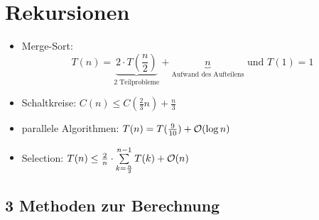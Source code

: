 %
%
\chapter{Rekursionen}
\begin{itemize}
\item
Merge-Sort: 
$$
T(n) = \underbrace{2 \cdot T(\frac{n}{2})}_{\text{2 Teilprobleme}} + \underbrace{n}_{\text{Aufwand des Aufteilens}} \text{ und } T(1)=1
$$
\item 
Schaltkreise: $C(n) \leq C(\frac{2}{3}n) + \frac{n}{3}$ 
\item
parallele Algorithmen: $T(n) = T(\frac{9}{10}) + \mathcal{O}(\log n)$ 
\item
Selection: $T(n) \leq \frac{2}{n} \cdot \sum \limits_{k=\frac{n}{2}}^{n-1} T(k) + \mathcal{O}(n)$ 
\end{itemize}

\section{3 Methoden zur Berechnung}

